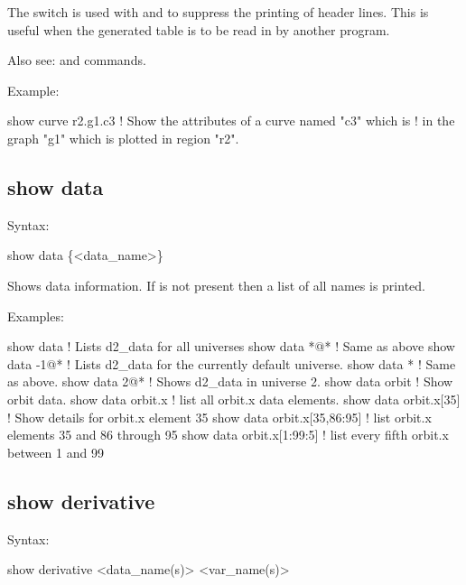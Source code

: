 {{{{{The  switch is used with  and  to suppress the
printing of header lines. This is useful when the generated table is to be read in by
another program.

Also see:  and  commands.

Example:
\begin{example}
  show curve r2.g1.c3     ! Show the attributes of a curve named "c3" which is 
                          !   in the graph "g1" which is plotted in region "r2".
\end{example}


\subsection{show data}
\label{s:show.data}

Syntax:
\begin{example}
  show data \{<data_name>\}
\end{example}

Shows data information. If  is not present then a list of all 
names is printed.

Examples:
\begin{example}
  show data                   ! Lists d2_data for all universes
  show data *@*               ! Same as above
  show data -1@*              ! Lists d2_data for the currently default universe.
  show data *                 ! Same as above.
  show data 2@*               ! Shows d2_data in universe 2.
  show data orbit             ! Show orbit data.
  show data orbit.x           ! list all orbit.x data elements.
  show data orbit.x[35]       ! Show details for orbit.x element 35
  show data orbit.x[35,86:95] ! list orbit.x elements 35 and 86 through 95
  show data orbit.x[1:99:5]   ! list every fifth orbit.x between 1 and 99  
\end{example}


\subsection{show derivative}
\label{s:show.derivative}

Syntax:
\begin{example}
  show derivative <data_name(s)> <var_name(s)>
\end{example}


}}}}}
